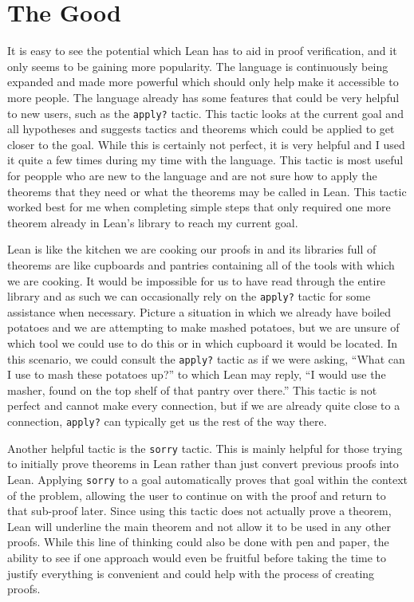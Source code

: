 \documentclass[
  letterpaper,
]{scrreprt}
\theoremstyle{remark}
\begin{document}
\hypertarget{the-good}{%
\section{The Good}\label{the-good}}

It is easy to see the potential which Lean has to aid in proof
verification, and it only seems to be gaining more popularity. The
language is continuously being expanded and made more powerful which
should only help make it accessible to more people. The language already
has some features that could be very helpful to new users, such as the
\texttt{apply?} tactic. This tactic looks at the current goal and all
hypotheses and suggests tactics and theorems which could be applied to
get closer to the goal. While this is certainly not perfect, it is very
helpful and I used it quite a few times during my time with the
language. This tactic is most useful for peopple who are new to the
language and are not sure how to apply the theorems that they need or
what the theorems may be called in Lean. This tactic worked best for me
when completing simple steps that only required one more theorem already
in Lean's library to reach my current goal.

Lean is like the kitchen we are cooking our proofs in and its libraries
full of theorems are like cupboards and pantries containing all of the
tools with which we are cooking. It would be impossible for us to have
read through the entire library and as such we can occasionally rely on
the \texttt{apply?} tactic for some assistance when necessary. Picture a
situation in which we already have boiled potatoes and we are attempting
to make mashed potatoes, but we are unsure of which tool we could use to
do this or in which cupboard it would be located. In this scenario, we
could consult the \texttt{apply?} tactic as if we were asking, ``What
can I use to mash these potatoes up?'' to which Lean may reply, ``I
would use the masher, found on the top shelf of that pantry over
there.'' This tactic is not perfect and cannot make every connection,
but if we are already quite close to a connection, \texttt{apply?} can
typically get us the rest of the way there.

Another helpful tactic is the \texttt{sorry} tactic. This is mainly
helpful for those trying to initially prove theorems in Lean rather than
just convert previous proofs into Lean. Applying \texttt{sorry} to a
goal automatically proves that goal within the context of the problem,
allowing the user to continue on with the proof and return to that
sub-proof later. Since using this tactic does not actually prove a
theorem, Lean will underline the main theorem and not allow it to be
used in any other proofs. While this line of thinking could also be done
with pen and paper, the ability to see if one approach would even be
fruitful before taking the time to justify everything is convenient and
could help with the process of creating proofs.
\end{document}
